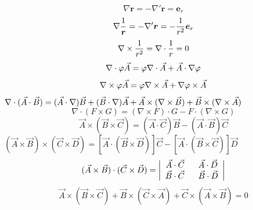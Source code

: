 \documentclass[UTF8,8pt]{ctexart}
\begin{document}
\begin{multicols}{3}
    $$\nabla\bm{r}=-\nabla'\bm{r}=\bm{e}_r$$
    $$\nabla\frac{1}{\bm{r}}=-\nabla'\bm{r}=-\frac{1}{r^2}\bm{e}_r$$
    $$\nabla\times\frac{1}{r^2}=\nabla\cdot\frac{1}{r}=0$$
    $$\nabla\cdot\varphi\vec{A}=\varphi\nabla\cdot\vec{A}+\vec{A}\cdot\nabla\varphi$$
    $$\nabla\times\varphi\vec{A}=\varphi\nabla\times\vec{A}+\nabla\varphi\times\vec{A}$$
    $\nabla\cdot(\vec{A}\cdot\vec{B}) = (\vec{A}\cdot\nabla)\vec{B}+(\vec{B}\cdot\nabla)\vec{A}+\vec{A}\times(\nabla\times\vec{B})+\vec{B}\times(\nabla\times\vec{A})$
    $$\nabla\cdot(F\times G)=(\nabla\times F)\cdot G-F\cdot(\nabla\times G)$$
    $$\vec{A}\times(\vec{B}\times\vec{C})=(\vec{A}\cdot\vec{C})\vec{B}-(\vec{A}\cdot\vec{B})\vec{C}$$
    $( \vec { A } \times \vec { B } ) \times ( \vec { C } \times \vec { D } ) = [ \vec { A } \cdot ( \vec { B } \times \vec { D } ) ] \vec { C } - [ \vec { A } \cdot ( \vec { B } \times \vec { C } ) ] \vec { D }$
    $$( \vec { A } \times \vec { B } ) \cdot ( \vec { C } \times \vec { D } ) = \abs{\ar{\vec{A}\cdot\vec{C}&\ \ \vec{A}\cdot\vec{D}\\
    \vec{B}\cdot\vec{C}&\ \ \vec{B}\cdot\vec{D}}}$$
    $$\vec { A } \times ( \vec { B } \times \vec { C } ) + \vec { B } \times ( \vec { C } \times \vec { A } ) + \vec { C } \times ( \vec { A } \times \vec { B } ) = 0$$
\end{multicols}
\end{document}

